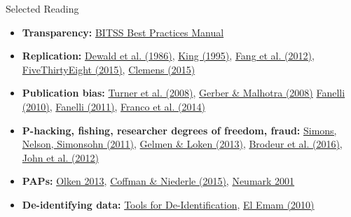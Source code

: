 \documentclass[12pt, compress]{beamer} %
\let\noteitem\item %
\renewcommand{\item}{ 
	\noteitem\vspace{\fill}
	}
\begin{document}
\begin{frame}{Selected Reading}
\footnotesize
\begin{itemize}
	\item \textbf{Transparency:} \href{https://github.com/garretchristensen/BestPracticesManual}{BITSS Best Practices Manual}
	\item \textbf{Replication:}  \href{http://www.jstor.org/stable/1806061?seq=1\#fndtn-page\_scan\_tab\_contents}{Dewald et al. (1986)}, \href{http://gking.harvard.edu/files/replication.pdf}{King (1995)}, \href{http://www.pnas.org/content/109/42/17028.long}{Fang et al. (2012)}, \href{https://fivethirtyeight.com/features/science-isnt-broken/}{FiveThirtyEight (2015)}, \href{https://www.cgdev.org/sites/default/files/CGD-Working-Paper-399-Clemens-Meaning-Failed-Replications.pdf}{Clemens (2015)}
	\item \textbf{Publication bias:} \href{http://www.nejm.org/doi/full/10.1056/nejmsa065779}{Turner et al. (2008)}, \href{http://journals.sagepub.com/doi/pdf/10.1177/0049124108318973}{Gerber \& Malhotra (2008)} \href{http://journals.plos.org/plosone/article?id=10.1371/journal.pone.0010068}{Fanelli (2010)}, \href{https://link.springer.com/article/10.1007/s11192-011-0494-7}{Fanelli (2011)}, \href{http://science.sciencemag.org/content/345/6203/1502}{Franco et al. (2014)}
	\item \textbf{P-hacking, fishing, researcher degrees of freedom, fraud:} \href{https://papers.ssrn.com/sol3/papers.cfm?abstract_id=1850704}{Simons, Nelson, Simonsohn (2011)}, \href{http://www.stat.columbia.edu/~gelman/research/unpublished/p_hacking.pdf}{Gelmen \& Loken (2013)}, \href{https://www.aeaweb.org/articles?id=10.1257/app.20150044}{Brodeur et al. (2016)}, \href{https://www.cmu.edu/dietrich/sds/docs/loewenstein/MeasPrevalQuestTruthTelling.pdf}{John et al. (2012)}
	\item \textbf{PAPs:} \href{https://www.aeaweb.org/articles?id=10.1257/jep.29.3.61}{Olken 2013}, \href{https://www.aeaweb.org/articles?id=10.1257/jep.29.3.81}{Coffman \& Niederle (2015)}, \href{http://onlinelibrary.wiley.com/doi/10.1111/0019-8676.00199/full}{Neumark 2001}
	\item \textbf{De-identifying data:} \href{http://www.ehealthinformation.ca/wp-content/uploads/2014/08/2009-Tools-for-De-Identification-of-Personal-Health.pdf}{Tools for De-Identification}, \href{http://www.ehealthinformation.ca/wp-content/uploads/2014/08/2010-Risk-based-de-identification-of-health-data.pdf}{El Emam (2010)}

\end{itemize}
\end{frame}
\end{document}
